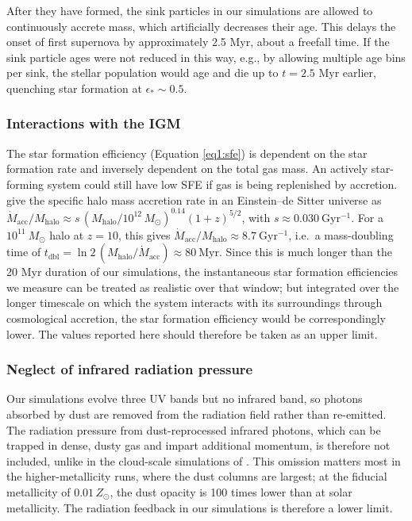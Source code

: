 \documentclass[twocolumn,linenumbers]{aastex631}
\begin{document}
After they have formed, the sink particles in our simulations are allowed to continuously accrete mass, which artificially decreases their age. This delays the onset of first supernova by approximately 2.5 Myr, about a freefall time. If the sink particle ages were not reduced in this way, e.g., by allowing multiple age bins per sink, the stellar population would age and die up to $t = 2.5$ Myr earlier, quenching star formation at $\epsilon_* \sim 0.5$.

    
\subsubsection{Interactions with the IGM}
The star formation efficiency (Equation \ref{eq1:sfe}) is dependent on the star formation rate and inversely dependent on the total gas mass. An actively star-forming system could still have low SFE if gas is being replenished by accretion. \citet{2025MNRAS.540.3350A} give the specific halo mass accretion rate in an Einstein--de Sitter universe as $\dot{M}_\mathrm{acc}/M_\mathrm{halo} \approx s\,(M_\mathrm{halo}/10^{12}\,M_\odot)^{0.14}(1+z)^{5/2}$, with $s\approx0.030\ \mathrm{Gyr^{-1}}$. For a $10^{11}\ M_\odot$ halo at $z=10$, this gives $\dot{M}_\mathrm{acc}/M_\mathrm{halo} \approx 8.7\ \mathrm{Gyr^{-1}}$, i.e.\ a mass-doubling time of $t_\mathrm{dbl} = \ln2\,(M_\mathrm{halo}/\dot{M}_\mathrm{acc}) \approx 80\ \mathrm{Myr}$. Since this is much longer than the 20 Myr duration of our simulations, the instantaneous star formation efficiencies we measure can be treated as realistic over that window; but integrated over the longer timescale on which the system interacts with its surroundings through cosmological accretion, the star formation efficiency would be correspondingly lower. The values reported here should therefore be taken as an upper limit.



\subsubsection{Neglect of infrared radiation pressure}\label{sec:ir_caveat}
Our simulations evolve three UV bands but no infrared band, so photons absorbed by dust are removed from the radiation field rather than re-emitted. The radiation pressure from dust-reprocessed infrared photons, which can be trapped in dense, dusty gas and impart additional momentum, is therefore not included, unlike in the cloud-scale simulations of \citet{2023MNRAS.521.5160M}. This omission matters most in the higher-metallicity runs, where the dust columns are largest; at the fiducial metallicity of $0.01\,Z_\odot$, the dust opacity is 100 times lower than at solar metallicity. The radiation feedback in our simulations is therefore a lower limit.
\end{document}
